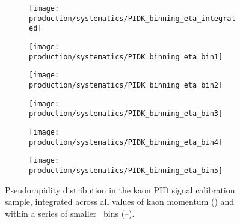 \begin{figure}
  \begin{subfigure}{0.5\textwidth}
    \centering
    \texttt{[image: production/systematics/PIDK\_binning\_eta\_integrated]}
    \caption{}
    \label{fig:prod:syst:pid:kde_eta:integrated}
  \end{subfigure}
  \begin{subfigure}{0.5\textwidth}
    \centering
    \texttt{[image: production/systematics/PIDK\_binning\_eta\_bin1]}
    \caption{}
    \label{fig:prod:syst:pid:kde_eta:bin1}
  \end{subfigure}
  \begin{subfigure}{0.5\textwidth}
    \centering
    \texttt{[image: production/systematics/PIDK\_binning\_eta\_bin2]}
    \caption{}
    \label{fig:prod:syst:pid:kde_eta:bin2}
  \end{subfigure}
  \begin{subfigure}{0.5\textwidth}
    \centering
    \texttt{[image: production/systematics/PIDK\_binning\_eta\_bin3]}
    \caption{}
    \label{fig:prod:syst:pid:kde_eta:bin3}
  \end{subfigure}
  \begin{subfigure}{0.5\textwidth}
    \centering
    \texttt{[image: production/systematics/PIDK\_binning\_eta\_bin4]}
    \caption{}
    \label{fig:prod:syst:pid:kde_eta:bin4}
  \end{subfigure}
  \begin{subfigure}{0.5\textwidth}
    \centering
    \texttt{[image: production/systematics/PIDK\_binning\_eta\_bin5]}
    \caption{}
    \label{fig:prod:syst:pid:kde_eta:bin5}
  \end{subfigure}
  \caption{%
    Pseudorapidity distribution in the kaon \ac{PID} signal calibration sample,
    integrated across all values of kaon momentum
    () and within a series of
    smaller \ptot\ bins
    (--).
  }
  \label{fig:prod:syst:pid:kde_eta}
\end{figure}

